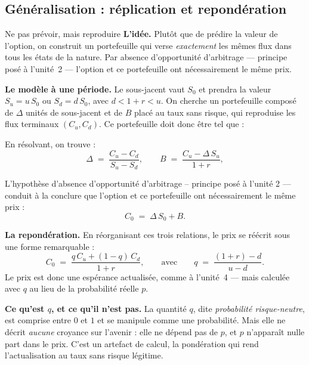 \subsection{Généralisation : réplication et repondération}

\begin{generalisation}{Ne pas prévoir, mais reproduire}
\textbf{L'idée.} Plutôt que de prédire la valeur de l'option, on construit un
portefeuille qui verse \emph{exactement} les mêmes flux dans tous les états de la nature.
Par absence d'opportunité d'arbitrage --- principe posé à l'unité~2 --- l'option
et ce portefeuille ont nécessairement le même prix.

\medskip
\textbf{Le modèle à une période.} Le sous-jacent vaut $S_0$ et prendra la valeur
$S_u = u\,S_0$ ou $S_d = d\,S_0$, avec $d < 1+r < u$. On cherche un portefeuille
composé de $\Delta$ unités de sous-jacent et de $B$ placé au taux sans risque,
qui reproduise les flux terminaux $(C_u, C_d)$. Ce portefeuille doit donc être tel que :\\
\begin{description}[leftmargin=3cm, style=nextline, font=\normalfont]
\end{description}

En résolvant, on trouve :\\

\[
  \Delta \;=\; \frac{C_u - C_d}{S_u - S_d},
  \qquad
  B \;=\; \frac{C_u - \Delta\,S_u}{1+r},
\]

L’hypothèse d’absence d'opportunité d'arbitrage – principe posé à l'unité 2 — conduit à la conclure que l'option et ce portefeuille ont nécessairement le même prix :\\
\[
  C_0 \;=\; \Delta\,S_0 + B .
\]


\medskip
\textbf{La repondération.} En réorganisant ces trois relations, le prix se
réécrit sous une forme remarquable :
\[
  C_0 \;=\; \frac{q\,C_u + (1-q)\,C_d}{1+r},
  \qquad\text{avec}\qquad
  q \;=\; \frac{(1+r) - d}{u - d}.
\]
Le prix est donc une espérance actualisée, comme à l'unité~4 --- mais calculée
avec $q$ au lieu de la probabilité réelle $p$.

\medskip
\textbf{Ce qu'est $q$, et ce qu'il n'est pas.} La quantité $q$, dite
\emph{probabilité risque-neutre}, est comprise
entre $0$ et $1$ et se manipule comme une probabilité. Mais elle ne décrit
\emph{aucune} croyance sur l'avenir : elle ne dépend pas de $p$, et $p$
n'apparaît nulle part dans le prix. C'est un artefact de calcul, la pondération
qui rend l'actualisation au taux sans risque légitime.


\end{generalisation}
